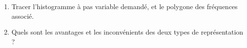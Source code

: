 \begin{exercice}
\begin{enumerate}
\item Tracer l'histogramme \`a pas variable demand\'e, et le polygone des fr\'equences associ\'e.

\item Quels sont les avantages et les inconv\'enients des deux types de repr\'esentation ?

\end{enumerate}


\end{exercice}
